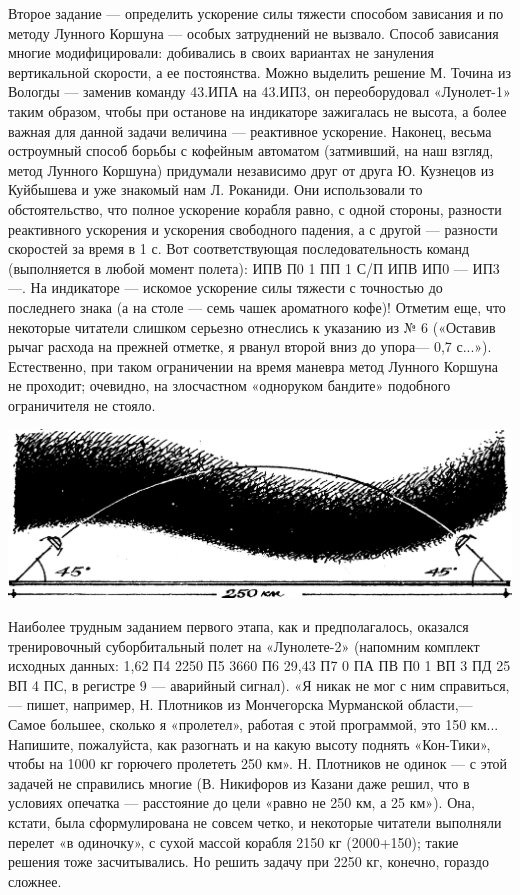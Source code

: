 \documentclass[11pt,a4paper,oneside]{article}
\begin{document}
Второе задание — определить ускорение силы тяжести способом зависания и по методу Лунного Коршуна — особых затруднений не вызвало. Способ зависания многие модифицировали: добивались в своих вариантах не зануления вертикальной скорости, а ее постоянства. Можно выделить решение М. Точина из Вологды — заменив команду 43.ИПА на 43.ИП3, он переоборудовал «Лунолет-1» таким образом, чтобы при останове на индикаторе зажигалась не высота, а более важная для данной задачи величина — реактивное ускорение. Наконец, весьма остроумный способ борьбы с кофейным автоматом (затмивший, на наш взгляд, метод Лунного Коршуна) придумали независимо друг от друга Ю. Кузнецов из Куйбышева и уже знакомый нам Л. Роканиди. Они использовали то обстоятельство, что полное ускорение корабля равно, с одной стороны, разности реактивного ускорения и ускорения свободного падения, а с другой — разности скоростей за время в 1 с. Вот соответствующая последовательность команд (выполняется в любой момент полета): ИПВ П0 1 ПП 1 С/П ИПВ ИП0 — ИП3—. На индикаторе — искомое ускорение силы тяжести с точностью до последнего знака (а на столе — семь чашек ароматного кофе)! Отметим еще, что некоторые читатели слишком серьезно отнеслись к указанию из № 6 («Оставив рычаг расхода на прежней отметке, я рванул второй вниз до упора— 0,7 с...»). Естественно, при таком ограничении на время маневра метод Лунного Коршуна не проходит; очевидно, на злосчастном «одноруком бандите» подобного ограничителя не стояло.

\includegraphics[width=\textwidth]{resume1}

Наиболее трудным заданием первого этапа, как и предполагалось, оказался тренировочный суборбитальный полет на «Лунолете-2» (напомним комплект исходных данных: 1,62 П4 2250 П5 3660 П6 29,43 П7 0 ПА ПВ П0 1 ВП 3 ПД 25 ВП 4 ПС, в регистре 9 — аварийный сигнал). «Я никак не мог с ним справиться,— пишет, например, Н. Плотников из Мончегорска Мурманской области,— Самое большее, сколько я «пролетел», работая с этой программой, это 150 км... Напишите, пожалуйста, как разогнать и на какую высоту поднять «Кон-Тики», чтобы на 1000 кг горючего пролететь 250 км». Н. Плотников не одинок — с этой задачей не справились многие (В. Никифоров из Казани даже решил, что в условиях опечатка — расстояние до цели «равно не 250 км, а 25 км»). Она, кстати, была сформулирована не совсем четко, и некоторые читатели выполняли перелет «в одиночку», с сухой массой корабля 2150 кг (2000+150); такие решения тоже засчитывались. Но решить задачу при 2250 кг, конечно, гораздо сложнее.
\end{document}
